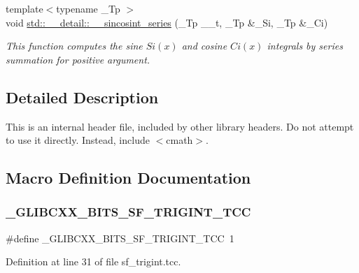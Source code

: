 \begin{DoxyCompactItemize}
{\footnotesize template$<$typename \+\_\+\+Tp $>$ }\\void \hyperlink{namespacestd_1_1____detail_aea85e0044476065ed4a067f1aa9647cb}{std\+::\+\_\+\+\_\+detail\+::\+\_\+\+\_\+sincosint\+\_\+series} (\+\_\+\+Tp \+\_\+\+\_\+t, \+\_\+\+Tp \&\+\_\+\+Si, \+\_\+\+Tp \&\+\_\+\+Ci)
\begin{DoxyCompactList}\small\item\em This function computes the sine $ Si(x) $ and cosine $ Ci(x) $ integrals by series summation for positive argument. \end{DoxyCompactList}\end{DoxyCompactItemize}


\subsection{Detailed Description}
This is an internal header file, included by other library headers. Do not attempt to use it directly. Instead, include $<$cmath$>$. 

\subsection{Macro Definition Documentation}
\mbox{\label{sf__trigint_8tcc_a8ba3ab1895ab4f89f7ee4d01d6db906e}} 
\subsubsection{\texorpdfstring{\+\_\+\+G\+L\+I\+B\+C\+X\+X\+\_\+\+B\+I\+T\+S\+\_\+\+S\+F\+\_\+\+T\+R\+I\+G\+I\+N\+T\+\_\+\+T\+CC}{\_GLIBCXX\_BITS\_SF\_TRIGINT\_TCC}}
{\footnotesize\ttfamily \#define \+\_\+\+G\+L\+I\+B\+C\+X\+X\+\_\+\+B\+I\+T\+S\+\_\+\+S\+F\+\_\+\+T\+R\+I\+G\+I\+N\+T\+\_\+\+T\+CC~1}



Definition at line 31 of file sf\+\_\+trigint.\+tcc.

